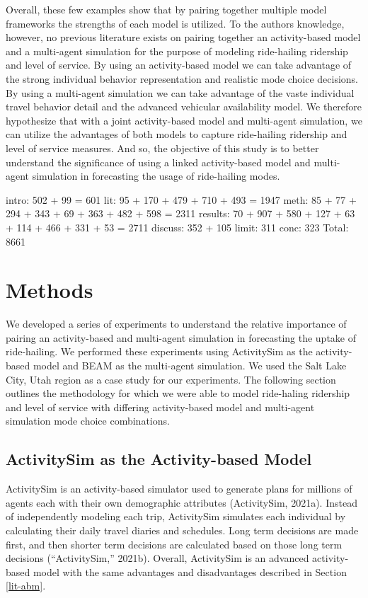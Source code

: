 \documentclass[fancy, masters]{byuthesis}
\begin{document}
Overall, these few examples show that by pairing together multiple model frameworks the strengths of each model is utilized. To the authors knowledge, however, no previous literature exists on pairing together an activity-based model and a multi-agent simulation for the purpose of modeling ride-hailing ridership and level of service. By using an activity-based model we can take advantage of the strong individual behavior representation and realistic mode choice decisions. By using a multi-agent simulation we can take advantage of the vaste individual travel behavior detail and the advanced vehicular availability model. We therefore hypothesize that with a joint activity-based model and multi-agent simulation, we can utilize the advantages of both models to capture ride-hailing ridership and level of service measures. And so, the objective of this study is to better understand the significance of using a linked activity-based model and multi-agent simulation in forecasting the usage of ride-hailing modes.

intro: 502 + 99 = 601
lit: 95 + 170 + 479 + 710 + 493 = 1947
meth: 85 + 77 + 294 + 343 + 69 + 363 + 482 + 598 = 2311
results: 70 + 907 + 580 + 127 + 63 + 114 + 466 + 331 + 53 = 2711
discuss: 352 + 105
limit: 311
conc: 323
Total: 8661

\hypertarget{methods}{%
\chapter{Methods}\label{methods}}

We developed a series of experiments to understand the relative importance of pairing an activity-based and multi-agent simulation in forecasting the uptake of ride-hailing. We performed these experiments using ActivitySim as the activity-based model and BEAM as the multi-agent simulation. We used the Salt Lake City, Utah region as a case study for our experiments. The following section outlines the methodology for which we were able to model ride-haling ridership and level of service with differing activity-based model and multi-agent simulation mode choice combinations.

\hypertarget{meth-asim}{%
\section{ActivitySim as the Activity-based Model}\label{meth-asim}}

ActivitySim is an activity-based simulator used to generate plans for millions of agents each with their own demographic attributes (ActivitySim, 2021a). Instead of independently modeling each trip, ActivitySim simulates each individual by calculating their daily travel diaries and schedules. Long term decisions are made first, and then shorter term decisions are calculated based on those long term decisions ({``ActivitySim,''} 2021b). Overall, ActivitySim is an advanced activity-based model with the same advantages and disadvantages described in Section \ref{lit-abm}.
\end{document}
